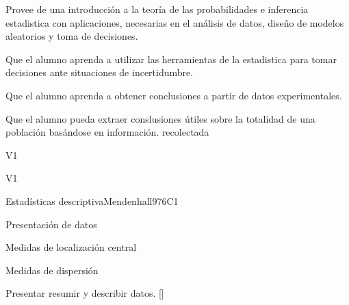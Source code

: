 
\begin{syllabus}


\begin{justification}
Provee de una introducción a la teoría de las probabilidades e inferencia estadistica  con aplicaciones, necesarias en el análisis de datos, diseño de modelos aleatorios y toma de decisiones.
\end{justification}

\begin{goals}
\item Que el alumno aprenda a utilizar las herramientas de la estadistica  para tomar decisiones ante situaciones de incertidumbre.
\item Que el alumno aprenda a obtener conclusiones a partir de datos experimentales.
\item Que el alumno pueda extraer conslusiones útiles sobre la totalidad de una población basándose en información. recolectada
\end{goals}

\begin{outcomes}{V1}
   \item {}
   \item {}
   \item {}
\end{outcomes}

\begin{competences}{V1}
    \item {} 
    \item {}
    \item {}
\end{competences}


\begin{unit}{}{Estadísticas descriptiva}{Mendenhall97}{6}{C1}
\begin{topics}
      \item Presentación de datos
      \item Medidas de localización central
      \item Medidas de dispersión
   \end{topics}

   \begin{learningoutcomes}
      \item Presentar resumir y describir datos. [\Usage]
   \end{learningoutcomes}
\end{unit}


\end{syllabus}
